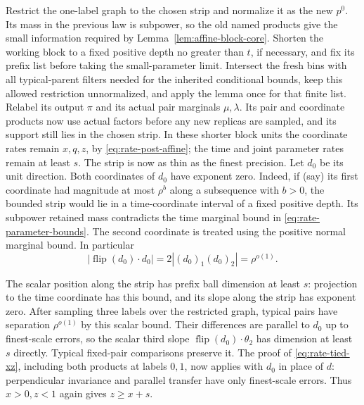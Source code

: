 Restrict the one-label graph to the chosen strip and normalize it as
the new $p^0$.  Its mass in the previous law is subpower, so the old
named products give the small information required by
Lemma~\ref{lem:affine-block-core}.  Shorten the working block to a fixed
positive depth no greater than $t$, if necessary, and fix its prefix
list before taking the small-parameter limit.  Intersect the fresh
bins with all typical-parent filters needed for the inherited
conditional bounds, keep this allowed restriction unnormalized, and
apply the lemma once for that finite list.  Relabel its output $\pi$
and its actual pair marginals $\mu,\lambda$.  Its pair and coordinate
products now use actual factors before any new replicas are sampled,
and its support still lies in the chosen strip.  In these shorter
block units the coordinate rates remain $x,q,z$, by
\eqref{eq:rate-post-affine}; the time and joint parameter rates remain
at least $s$.  The strip is now as thin as the finest precision.
Let $d_0$ be its unit direction. Both coordinates of $d_0$ have
exponent zero. Indeed, if (say) its first coordinate had magnitude
at most $\rho^b$ along a subsequence with $b>0$, the bounded strip
would lie in a time-coordinate interval of a fixed positive depth.
Its subpower retained mass contradicts the time marginal bound in
\eqref{eq:rate-parameter-bounds}. The second coordinate is treated
using the positive normal marginal bound. In particular
\[
 |\operatorname{flip}(d_0)\cdot d_0|
       =2|(d_0)_1(d_0)_2|=\rho^{o(1)}.
\]

The scalar position along the strip has prefix ball dimension at
least $s$: projection to the time coordinate has this bound, and
its slope along the strip has exponent zero. After sampling three
labels over the restricted graph, typical pairs have separation
$\rho^{o(1)}$ by this scalar bound. Their differences are parallel
to $d_0$ up to finest-scale errors, so the scalar third slope
$\operatorname{flip}(d_0)\cdot\theta_2$ has dimension at least $s$
directly. Typical fixed-pair comparisons preserve it. The proof of
\eqref{eq:rate-tied-xz}, including both products at labels $0,1$,
now applies with $d_0$ in place of $d$: perpendicular invariance and
parallel transfer have only finest-scale errors. Thus $x>0,z<1$
again gives $z\ge x+s$.

